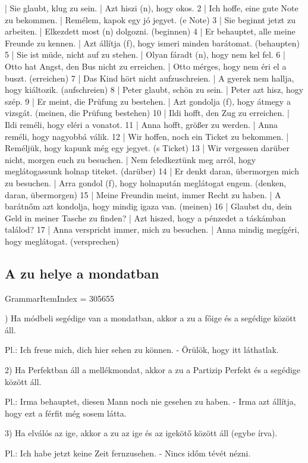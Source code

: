 \documentclass{article}
\newenvironment{desc}{\verbatim}{\endverbatim}
\newenvironment{exmp}{\verbatim}{\endverbatim}
\begin{document}
\begin{exmp}
1 | Sie glaubt, klug zu sein. | Azt hiszi (n), hogy okos.
2 | Ich hoffe, eine gute Note zu bekommen. | Remélem, kapok egy jó jegyet. (e Note)
3 | Sie beginnt jetzt zu arbeiten. | Elkezdett most (n) dolgozni. (beginnen)
4 | Er behauptet, alle meine Freunde zu kennen. | Azt állítja (f), hogy ismeri minden barátomat. (behaupten)
5 | Sie ist müde, nicht auf zu stehen. | Olyan fáradt (n), hogy nem kel fel.
6 | Otto hat Angst, den Bus nicht zu erreichen. | Otto mérges, hogy nem éri el a buszt. (erreichen)
7 | Das Kind hört nicht aufzuschreien. | A gyerek nem hallja, hogy kiáltozik. (aufschreien)
8 | Peter glaubt, schön zu sein. | Peter azt hisz, hogy szép.
9 | Er meint, die Prüfung zu bestehen. | Azt gondolja (f), hogy átmegy a vizsgát. (meinen, die Prüfung bestehen)
10 | Ildi hofft, den Zug zu erreichen. | Ildi reméli, hogy eléri a vonatot.
11 | Anna hofft, größer zu werden. | Anna reméli, hogy nagyobbá válik.
12 | Wir hoffen, noch ein Ticket zu bekommen. | Reméljük, hogy kapunk még egy jegyet. (s Ticket)
13 | Wir vergessen darüber nicht, morgen euch zu besuchen. | Nem feledkeztünk meg arról, hogy meglátogassunk holnap titeket. (darüber)
14 | Er denkt daran, übermorgen mich zu besuchen. | Arra gondol (f), hogy holnapután meglátogat engem. (denken, daran, übermorgen)
15 | Meine Freundin meint, immer Recht zu haben. | A barátnőm azt kondolja, hogy mindig igaza van. (meinen)
16 | Glaubst du, dein Geld in meiner Tasche zu finden? | Azt hiszed, hogy a pénzedet a táskámban találod?
17 | Anna verspricht immer, mich zu besuchen. | Anna mindig megígéri, hogy meglátogat. (versprechen)
\end{exmp}

\subsection{A zu helye a mondatban}

GrammarItemIndex = 305655

\begin{desc}
1) Ha módbeli segédige van a mondatban, akkor a zu a főige és a segédige között áll.

Pl.: Ich freue mich, dich hier sehen zu können. - Örülök, hogy itt láthatlak.

2) Ha Perfektban áll a mellékmondat, akkor a zu a Partizip Perfekt és a segédige között áll.

Pl.: Irma behauptet, diesen Mann noch nie gesehen zu haben. - Irma azt állítja, hogy ezt a férfit még sosem látta.

3) Ha elválós az ige, akkor a zu az ige és az igekötő között áll (egybe írva).

Pl.: Ich habe jetzt keine Zeit fernzusehen. - Nincs időm tévét nézni.
\end{desc}
\end{document}
